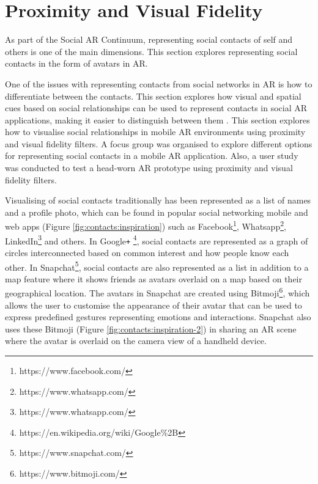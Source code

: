 \section{Proximity and Visual Fidelity}
\label{sec:contacts:visualising}

As part of the Social AR Continuum, representing social contacts of self and others is one of the main dimensions. This section explores representing social contacts in the form of avatars in AR. 

One of the issues with representing contacts from social networks in AR is how to differentiate between the contacts. This section explores how visual and spatial cues based on social relationships can be used to represent contacts in social AR applications, making it easier to distinguish between them \cite{Nassani2017b}. This section explores how to visualise social relationships in mobile AR environments using proximity and visual fidelity filters. A focus group was organised to explore different options for representing social contacts in a mobile AR application. Also, a user study was conducted to test a head-worn AR prototype using proximity and visual fidelity filters. 

Visualising of social contacts traditionally has been represented as a list of names and a profile photo, which can be found in popular social networking mobile and web apps (Figure \ref{fig:contacts:inspiration}) such as Facebook\footnote{https://www.facebook.com/}, Whatsapp\footnote{https://www.whatsapp.com/}, LinkedIn\footnote{https://www.whatsapp.com/} and others. In Google\texttt{+} \footnote{https://en.wikipedia.org/wiki/Google\%2B}, social contacts are represented as a graph of circles interconnected based on common interest and how people know each other. In Snapchat\footnote{https://www.snapchat.com/}, social contacts are also represented as a list in addition to a map feature where it shows friends as avatars overlaid on a map based on their geographical location. The avatars in Snapchat are created using Bitmoji\footnote{https://www.bitmoji.com/}, which allows the user to customise the appearance of their avatar that can be used to express predefined gestures representing emotions and interactions. Snapchat also uses these Bitmoji (Figure \ref{fig:contacts:inspiration-2}) in sharing an AR scene where the avatar is overlaid on the camera view of a handheld device. 

